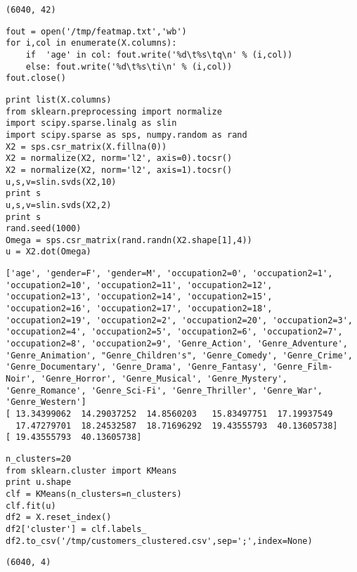 \documentclass[12pt,fleqn]{article}\usepackage{../common}
\begin{document}
\begin{verbatim}
(6040, 42)
\end{verbatim}

\begin{verbatim}
fout = open('/tmp/featmap.txt','wb')
for i,col in enumerate(X.columns):
    if  'age' in col: fout.write('%d\t%s\tq\n' % (i,col))
    else: fout.write('%d\t%s\ti\n' % (i,col))    
fout.close()
\end{verbatim}

\begin{verbatim}
print list(X.columns)
from sklearn.preprocessing import normalize
import scipy.sparse.linalg as slin
import scipy.sparse as sps, numpy.random as rand
X2 = sps.csr_matrix(X.fillna(0))
X2 = normalize(X2, norm='l2', axis=0).tocsr()
X2 = normalize(X2, norm='l2', axis=1).tocsr()    
u,s,v=slin.svds(X2,10)
print s
u,s,v=slin.svds(X2,2)
print s
rand.seed(1000)
Omega = sps.csr_matrix(rand.randn(X2.shape[1],4))
u = X2.dot(Omega)
\end{verbatim}

\begin{verbatim}
['age', 'gender=F', 'gender=M', 'occupation2=0', 'occupation2=1', 'occupation2=10', 'occupation2=11', 'occupation2=12', 'occupation2=13', 'occupation2=14', 'occupation2=15', 'occupation2=16', 'occupation2=17', 'occupation2=18', 'occupation2=19', 'occupation2=2', 'occupation2=20', 'occupation2=3', 'occupation2=4', 'occupation2=5', 'occupation2=6', 'occupation2=7', 'occupation2=8', 'occupation2=9', 'Genre_Action', 'Genre_Adventure', 'Genre_Animation', "Genre_Children's", 'Genre_Comedy', 'Genre_Crime', 'Genre_Documentary', 'Genre_Drama', 'Genre_Fantasy', 'Genre_Film-Noir', 'Genre_Horror', 'Genre_Musical', 'Genre_Mystery', 'Genre_Romance', 'Genre_Sci-Fi', 'Genre_Thriller', 'Genre_War', 'Genre_Western']
[ 13.34399062  14.29037252  14.8560203   15.83497751  17.19937549
  17.47279701  18.24532587  18.71696292  19.43555793  40.13605738]
[ 19.43555793  40.13605738]
\end{verbatim}

\begin{verbatim}
n_clusters=20
from sklearn.cluster import KMeans
print u.shape
clf = KMeans(n_clusters=n_clusters)
clf.fit(u)    
df2 = X.reset_index()
df2['cluster'] = clf.labels_
df2.to_csv('/tmp/customers_clustered.csv',sep=';',index=None)
\end{verbatim}

\begin{verbatim}
(6040, 4)
\end{verbatim}
\end{document}
